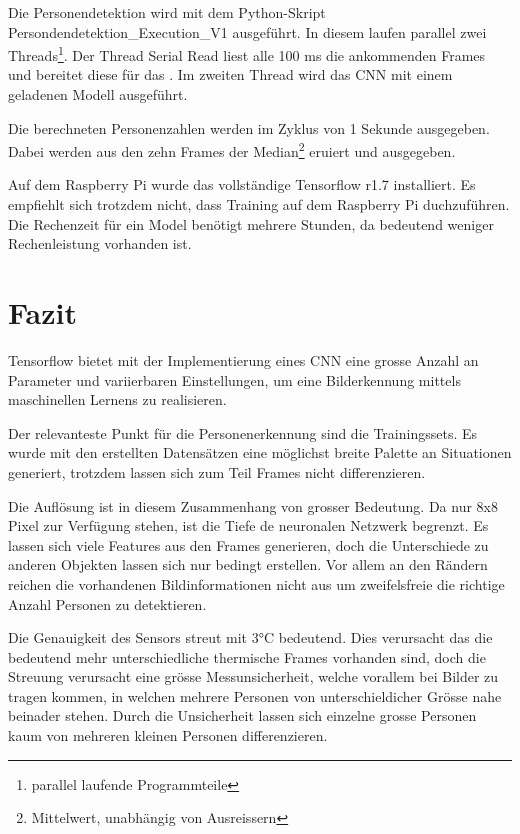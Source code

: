 Die Personendetektion wird mit dem Python-Skript Persondendetektion\_Execution\_V1 ausgeführt. In diesem laufen parallel zwei Threads\footnote{parallel laufende Programmteile}. Der Thread Serial Read liest alle 100 ms die ankommenden Frames und bereitet diese für das . Im zweiten Thread wird das \ac{CNN} mit einem geladenen Modell ausgeführt. 

Die berechneten Personenzahlen werden im Zyklus von 1 Sekunde ausgegeben. Dabei werden aus den zehn Frames der Median\footnote{Mittelwert, unabhängig von Ausreissern} eruiert und ausgegeben. 

Auf dem Raspberry Pi wurde das vollständige Tensorflow r1.7 installiert. Es empfiehlt sich trotzdem nicht, dass Training auf dem Raspberry Pi duchzuführen. Die Rechenzeit für ein Model benötigt mehrere Stunden, da bedeutend weniger Rechenleistung vorhanden ist. 


\section{Fazit}

Tensorflow bietet mit der Implementierung eines \ac{CNN} eine grosse Anzahl an Parameter und variierbaren Einstellungen, um eine Bilderkennung mittels maschinellen Lernens zu realisieren. 

Der relevanteste Punkt für die Personenerkennung sind die Trainingssets. Es wurde mit den erstellten Datensätzen eine möglichst breite Palette an Situationen generiert, trotzdem lassen sich zum Teil Frames nicht differenzieren.

Die Auflösung ist in diesem Zusammenhang von grosser Bedeutung. Da nur 8x8 Pixel zur Verfügung stehen, ist die Tiefe de neuronalen Netzwerk begrenzt. Es lassen sich viele Features aus den Frames generieren, doch die Unterschiede zu anderen Objekten lassen sich nur bedingt erstellen. Vor allem an den Rändern reichen die vorhandenen Bildinformationen nicht aus um zweifelsfreie die richtige Anzahl Personen zu detektieren. 

Die Genauigkeit des Sensors streut mit 3°C bedeutend. Dies verursacht das die bedeutend mehr unterschiedliche thermische Frames vorhanden sind, doch die Streuung verursacht eine grösse Messunsicherheit, welche vorallem bei Bilder zu tragen kommen, in welchen mehrere Personen von unterschieldicher Grösse nahe beinader stehen. Durch die Unsicherheit lassen sich einzelne grosse Personen kaum von mehreren kleinen Personen differenzieren.






